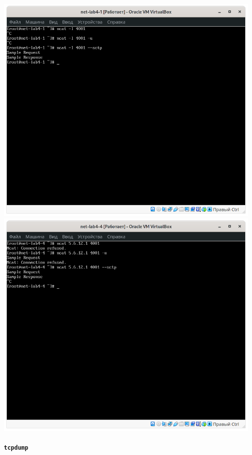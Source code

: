 \begin{center}
    \includegraphics[width=.49\textwidth]{screenshots/base-ncat-iptables-A}
    \includegraphics[width=.49\textwidth]{screenshots/base-ncat-iptables-B}
\end{center}

\paragraph{\texttt{tcpdump}}

